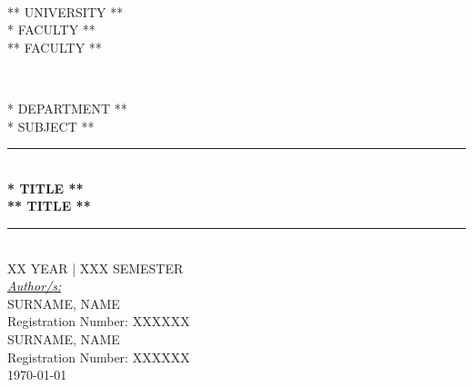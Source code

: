 \documentclass[12pt,a4paper, spanish]{article}
\begin{document}
\begin{titlepage}
  \newcommand{\HRule}{\rule{\linewidth}{0.5mm}}
  \centering

   \textsc{}\\[0.25cm]

   \textsc{\huge{** UNIVERSITY **}}\\[0.5cm]

   \textsc{\LARGE ** FACULTY **\\ ** FACULTY **}\\[0.3cm]

   \begin{figure}[H]
     \centering
     \qquad
     \\[0.5cm]
   \end{figure}

   \textsc{\Large ** DEPARTMENT **}\\[0.25cm]
   \textsc{\large ** SUBJECT **}\\[0.25cm]

   \HRule\\[0.4cm]

   {\huge\bfseries ** TITLE **\\[0.4cm] ** TITLE **}\\[0.4cm]
   \HRule\\[1.25cm]

    \textsc{\large XX YEAR | XXX SEMESTER}\\[1.5cm]

    {\large\underline{\textit{Author/s:}}}\\[0.2cm]
       \textsc{SURNAME, NAME}\\
               Registration Number: XXXXXX\\
       [0.5cm]
       \textsc{SURNAME, NAME}\\
               Registration Number: XXXXXX\\[0.5cm]

    \vfill\vfill\vfill
    {\large\today}


\end{titlepage}
\end{document}
